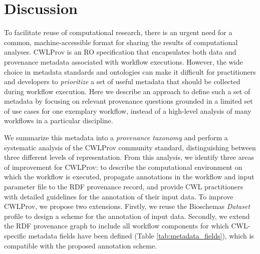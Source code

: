 \section{Discussion}
To facilitate reuse of computational research, there is an urgent need for a common, machine-accessible format for sharing the results of computational analyses. CWLProv \cite{khanSharingInteroperableWorkflow2019} is an RO specification that encapsulates both data and provenance metadata associated with workflow executions.
However, the wide choice in metadata standards and ontologies can make it difficult for practitioners and developers to \emph{prioritize} a set of useful metadata that should be collected during workflow execution.
Here we describe an approach to define such a set of metadata by focusing on relevant provenance questions grounded in a limited set of use cases for one exemplary workflow, instead of a high-level analysis of many workflows in a particular discipline. 

We summarize this metadata into a \emph{provenance taxonomy} and perform a systematic analysis of the CWLProv community standard, distinguishing between three different levels of representation. From this analysis, we identify three areas of improvement for CWLProv: to describe the computational environment on which the workflow is executed, propagate annotations in the workflow and input parameter file to the RDF provenance record, and provide CWL practitioners with detailed guidelines for the annotation of their input data. To improve CWLProv, we propose two extensions. Firstly, we reuse the Bioschemas \cite{michelBioschemasSchemaOrg2018} \emph{Dataset} profile to design a scheme for the annotation of input data. Secondly, we extend the RDF provenance graph to include all workflow components for which CWL-specific metadata fields have been defined (Table \ref{tab:metadata_fields}), which is compatible with the proposed annotation scheme. 

